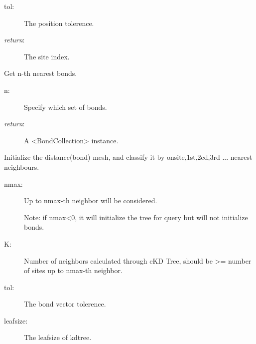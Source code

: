 \documentclass[letterpaper,10pt,oneside,openany]{sphinxmanual}
\begin{document}
\begin{fulllineitems}
\begin{fulllineitems}
\begin{description}
\item[{tol:}] \leavevmode
The position tolerence.

\item[{\emph{return}:}] \leavevmode
The site index.

\end{description}

\end{fulllineitems}


\begin{fulllineitems}
\label{index:lattice.structure.Structure.getbonds}
Get n-th nearest bonds.
\begin{description}
\item[{n: }] \leavevmode
Specify which set of bonds.

\item[{\emph{return}:}] \leavevmode
A \textless{}BondCollection\textgreater{} instance.

\end{description}

\end{fulllineitems}


\begin{fulllineitems}
\label{index:lattice.structure.Structure.initbonds}
Initialize the distance(bond) mesh, and classify it by onsite,1st,2ed,3rd ... nearest neighbours.
\begin{description}
\item[{nmax:}] \leavevmode
Up to nmax-th neighbor will be considered.

Note: if nmax\textless{}0, it will initialize the tree for query but will not initialize bonds.

\item[{K: }] \leavevmode
Number of neighbors calculated through cKD Tree, should be \textgreater{}= number of sites up to nmax-th neighbor.

\item[{tol:}] \leavevmode
The bond vector tolerence.

\item[{leafsize:}] \leavevmode
The leafsize of kdtree.


\end{description}
\end{fulllineitems}
\end{fulllineitems}
\end{document}
